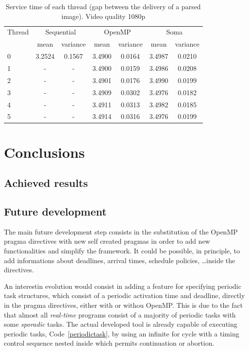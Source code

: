 \documentclass[a4paper,12pt,oneside]{book}
\begin{document}
\begin{table}
\begin{center}
\begin{tabular}{| l || c | c || c | c || c | c |} 
\hline
  Thread & \multicolumn{2}{|c||}{Sequential} & \multicolumn{2}{|c||}{OpenMP} & \multicolumn{2}{|c|}{Soma} \\
\cline{2-7}
& mean & variance & mean & variance & mean & variance \\
\cline{2-7}
\hline
0 & 3.2524 & 0.1567 & 3.4900 & 0.0164 & 3.4987 & 0.0210  \\
\hline
1 & - & - & 3.4900 & 0.0159 & 3.4986 & 0.0208 \\
\hline
2 & - & - & 3.4901 & 0.0176 & 3.4990 & 0.0199 \\
\hline 
3 & - & - & 3.4909 & 0.0302 & 3.4976 & 0.0182 \\
\hline
4 & - & - & 3.4911 & 0.0313 & 3.4982 & 0.0185 \\
\hline
5 & - & - & 3.4914 & 0.0316 & 3.4976 & 0.0199  \\
\hline
\end{tabular}
\caption{Service time of each thread (gap between the delivery of a parsed image). Video quality 1080p}
\label{times}
\end{center}
\end{table}





\chapter{Conclusions}
\section{Achieved results}
\section{Future development}

The main future development step consists in the substitution of the OpenMP pragma directives with new self created pragmas in order to add new functionalities and simplify the framework. It could be possible, in principle, to add informations about deadlines, arrival times, schedule policies, \dots inside the directives. 

An interestin evolution would consist in adding a feature for specifying periodic task structures, which consist of a periodic activation time and deadline, directly in the pragma directives, either with or withou OpenMP. This is due to the fact that almost all \emph{real-time} programs consist of a majority of periodic tasks with some \emph{sporadic} tasks. The actual developed tool is already capable of executing periodic tasks, Code~\ref{periodictask}, by using an infinite for cycle with a timing control sequence nested inside which permits continuation or abortion.
\end{document}
